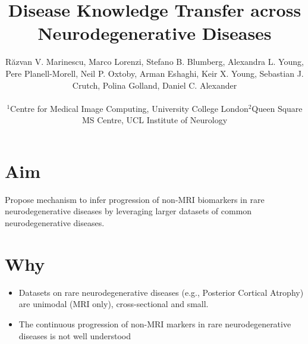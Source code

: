 \documentclass[portrait,a0,final,20pt]{a0poster}
\title{Disease Knowledge Transfer across Neurodegenerative Diseases}
\author{R\u{a}zvan V. Marinescu\inst{1,2}, Marco Lorenzi\inst{5}, Stefano B. Blumberg\inst{1}, Alexandra L. Young\inst{1}, Pere Planell-Morell\inst{1}, Neil P. Oxtoby\inst{1}, Arman Eshaghi\inst{1,3}, Keir X. Young\inst{4}, Sebastian J. Crutch\inst{4}, Polina Golland\inst{2}, Daniel C. Alexander\inst{1}\\
\begin{tabular}{l p{1cm} l p{1cm} l}
\large{$^1$Centre for Medical Image Computing, University College London}  & & \large{$^2$Queen Square MS Centre, UCL Institute of Neurology} \\
\end{tabular}
}
\newcommand{\fnt}[1]{\LARGE{#1}}
\begin{document}

\begin{minipage}{50cm}					%
\maketitle
\end{minipage}

\fnt{

\begin{multicols}{2}							
\raggedcolumns							%

\pagenumbering{gobble}

\vspace{-3em}


\section*{Aim}

Propose mechanism to infer progression of non-MRI biomarkers in rare neurodegenerative diseases by leveraging larger datasets of common neurodegenerative diseases.

\section*{Why}


\newcommand{\lp}{\lambda_{d_i}^{\psi(k)}}
\newcommand{\lpuu}{\lambda_{d_i}^{\psi(k),(u)}}
\newcommand{\lpum}{\lambda_{d_i}^{\psi(k),(u-1)}}

\begin{itemize}
 \item Datasets on rare neurodegenerative diseases (e.g., Posterior Cortical Atrophy) are unimodal (MRI only), cross-sectional and small.
 \item The continuous progression of non-MRI markers in rare neurodegenerative diseases is not well understood
\end{itemize}



 





\end{multicols}}
\end{document}
